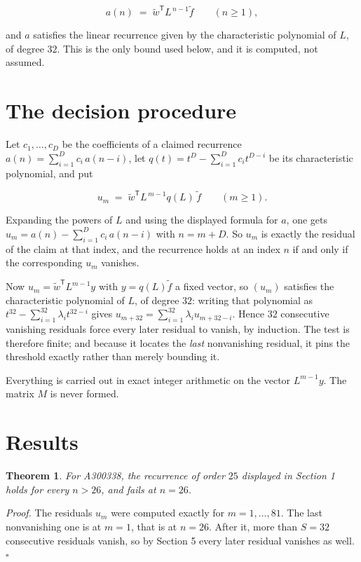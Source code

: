 \documentclass[11pt]{article}
\newtheorem{theorem}{Theorem}
\theoremstyle{definition}
\begin{document}
\[a(n) \;=\; \tilde w^{\mathsf T} L^{\,n-1} \tilde f \qquad (n \ge 1),\]

and $a$ satisfies the linear recurrence given by the characteristic polynomial of $L$, of degree $32$. This is the only bound used below, and it is computed, not assumed.

\section{The decision procedure}

Let $c_1,\dots,c_D$ be the coefficients of a claimed recurrence $a(n) = \sum_{i=1}^{D} c_i\,a(n-i)$, let $q(t) = t^{D} - \sum_{i=1}^{D} c_i t^{D-i}$ be its characteristic polynomial, and put

\[u_m \;=\; \tilde w^{\mathsf T} L^{\,m-1} q(L)\,\tilde f \qquad (m \ge 1).\]

Expanding the powers of $L$ and using the displayed formula for $a$, one gets $u_m = a(n) - \sum_{i=1}^{D} c_i\,a(n-i)$ with $n = m + D$. So $u_m$ is exactly the residual of the claim at that index, and the recurrence holds at an index $n$ if and only if the corresponding $u_m$ vanishes.

Now $u_m = \tilde w^{\mathsf T} L^{m-1} y$ with $y = q(L)\tilde f$ a fixed vector, so $(u_m)$ satisfies the characteristic polynomial of $L$, of degree $32$: writing that polynomial as $t^{32} - \sum_{i=1}^{32} \lambda_i t^{32-i}$ gives $u_{m+32} = \sum_{i=1}^{32} \lambda_i u_{m+32-i}$. Hence $32$ consecutive vanishing residuals force every later residual to vanish, by induction. The test is therefore finite; and because it locates the {\itshape last} nonvanishing residual, it pins the threshold exactly rather than merely bounding it.

Everything is carried out in exact integer arithmetic on the vector $L^{m-1}y$. The matrix $M$ is never formed.

\section{Results}

\begin{theorem} For A300338, the recurrence of order $25$ displayed in Section 1 holds for every $n > 26$, and fails at $n = 26$.\end{theorem}

{\itshape Proof.} The residuals $u_m$ were computed exactly for $m = 1,\dots,81$. The last nonvanishing one is at $m = 1$, that is at $n = 26$. After it, more than $S = 32$ consecutive residuals vanish, so by Section 5 every later residual vanishes as well. $\square$
\end{document}
